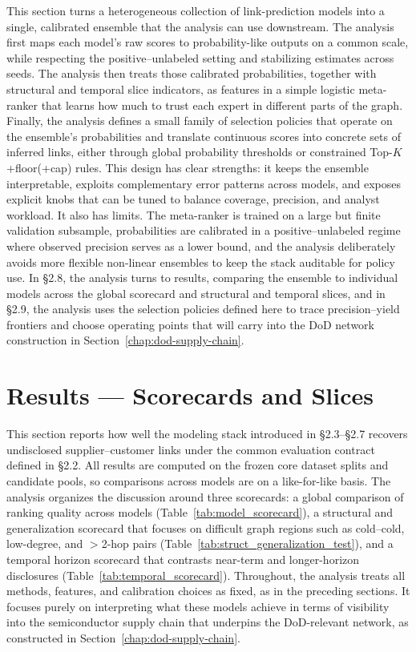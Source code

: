 This section turns a heterogeneous collection of link-prediction models into a single, calibrated ensemble that the analysis can use downstream. The analysis first maps each model's raw scores to probability-like outputs on a common scale, while respecting the positive--unlabeled setting and stabilizing estimates across seeds. The analysis then treats those calibrated probabilities, together with structural and temporal slice indicators, as features in a simple logistic meta-ranker that learns how much to trust each expert in different parts of the graph. Finally, the analysis defines a small family of selection policies that operate on the ensemble's probabilities and translate continuous scores into concrete sets of inferred links, either through global probability thresholds or constrained Top-\(K\)+floor(+cap) rules. This design has clear strengths: it keeps the ensemble interpretable, exploits complementary error patterns across models, and exposes explicit knobs that can be tuned to balance coverage, precision, and analyst workload. It also has limits. The meta-ranker is trained on a large but finite validation subsample, probabilities are calibrated in a positive--unlabeled regime where observed precision serves as a lower bound, and the analysis deliberately avoids more flexible non-linear ensembles to keep the stack auditable for policy use. In \S2.8, the analysis turns to results, comparing the ensemble to individual models across the global scorecard and structural and temporal slices, and in \S2.9, the analysis uses the selection policies defined here to trace precision--yield frontiers and choose operating points that will carry into the DoD network construction in Section~\ref{chap:dod-supply-chain}.

\section{Results --- Scorecards and Slices}

This section reports how well the modeling stack introduced in \S2.3--\S2.7 recovers undisclosed supplier--customer links under the common evaluation contract defined in \S2.2. All results are computed on the frozen core dataset splits and candidate pools, so comparisons across models are on a like-for-like basis. The analysis organizes the discussion around three scorecards: a global comparison of ranking quality across models (Table~\ref{tab:model_scorecard}), a structural and generalization scorecard that focuses on difficult graph regions such as cold--cold, low-degree, and \(>\)2-hop pairs (Table~\ref{tab:struct_generalization_test}), and a temporal horizon scorecard that contrasts near-term and longer-horizon disclosures (Table~\ref{tab:temporal_scorecard}). Throughout, the analysis treats all methods, features, and calibration choices as fixed, as in the preceding sections. It focuses purely on interpreting what these models achieve in terms of visibility into the semiconductor supply chain that underpins the DoD-relevant network, as constructed in Section~\ref{chap:dod-supply-chain}.

